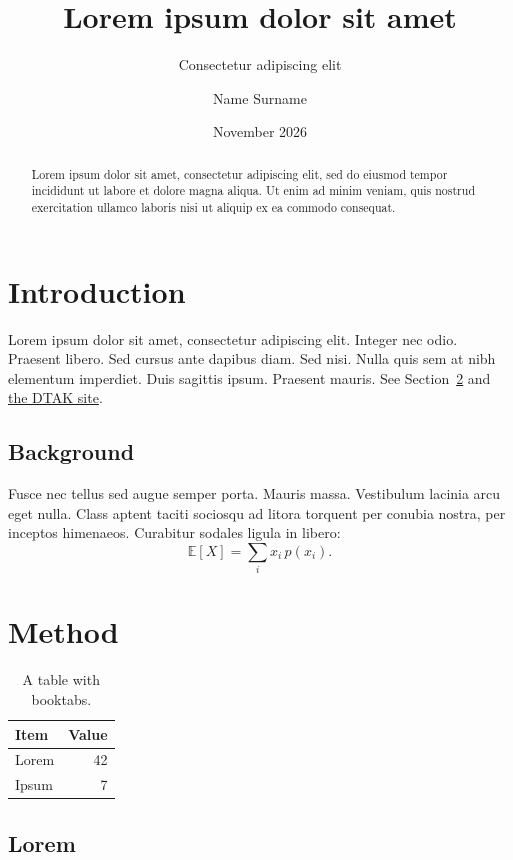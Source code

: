 \documentclass{dtakdoc}   %
\title{Lorem ipsum dolor sit amet}
\subtitle{Consectetur adipiscing elit}
\author{Name Surname}
\date{November 2026}
\begin{document}
\maketitle

\begin{abstract}
  Lorem ipsum dolor sit amet, consectetur adipiscing elit, sed do eiusmod tempor incididunt ut labore et dolore
  magna aliqua. Ut enim ad minim veniam, quis nostrud exercitation ullamco laboris nisi ut aliquip ex ea commodo
  consequat.
\end{abstract}

\section{Introduction}

Lorem ipsum dolor sit amet, consectetur adipiscing elit. Integer nec odio. Praesent libero. Sed cursus ante
dapibus diam. Sed nisi. Nulla quis sem at nibh elementum imperdiet. Duis sagittis ipsum. Praesent mauris. See
Section~\ref{sec:method} and \href{https://dtak.upc.edu}{the DTAK site}.

\subsection{Background}

Fusce nec tellus sed augue semper porta. Mauris massa. Vestibulum lacinia arcu eget nulla. Class aptent taciti
sociosqu ad litora torquent per conubia nostra, per inceptos himenaeos. Curabitur sodales ligula in libero:
\begin{equation}
  \mathbb{E}[X] = \sum_i x_i \, p(x_i).
\end{equation}

\section{Method}\label{sec:method}

\begin{table}[ht]
  \centering
  \caption{A table with booktabs.}
  \begin{tabular}{lr}
    \toprule
    Item  & Value \\
    \midrule
    Lorem & 42 \\
    Ipsum & 7 \\
    \bottomrule
  \end{tabular}
\end{table}

\subsection{Lorem}
\end{document}
